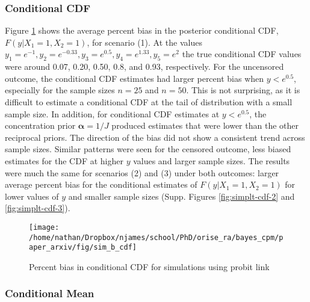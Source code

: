 \documentclass[
]{article}
\begin{document}
\hypertarget{conditional-cdf}{%
\subsubsection{Conditional CDF}\label{conditional-cdf}}

Figure \ref{fig:simplt-cdf-1} shows the average percent bias in the posterior conditional CDF, \(F(y|X_1=1,X_2=1)\), for scenario (1). At the values \(y_1=e^{-1},y_2=e^{-0.33},y_3=e^{0.5},y_4=e^{1.33},y_5=e^2\) the true conditional CDF values were around 0.07, 0.20, 0.50, 0.8, and 0.93, respectively. For the uncensored outcome, the conditional CDF estimates had larger percent bias when \(y<e^{0.5}\), especially for the sample sizes \(n=25\) and \(n=50\). This is not surprising, as it is difficult to estimate a conditional CDF at the tail of distribution with a small sample size. In addition, for conditional CDF estimates at \(y<e^{0.5}\), the concentration prior \(\boldsymbol{\alpha}=1/J\) produced estimates that were lower than the other reciprocal priors. The direction of the bias did not show a consistent trend across sample sizes. Similar patterns were seen for the censored outcome, less biased estimates for the CDF at higher \(y\) values and larger sample sizes. The results were much the same for scenarios (2) and (3) under both outcomes: larger average percent bias for the conditional estimates of \(F(y|X_1=1,X_2=1)\) for lower values of \(y\) and smaller sample sizes (Supp. Figures \ref{fig:simplt-cdf-2} and \ref{fig:simplt-cdf-3}).

\begin{figure}

{\centering \texttt{[image: /home/nathan/Dropbox/njames/school/PhD/orise\_ra/bayes\_cpm/paper\_arxiv/fig/sim\_b\_cdf]} 

}

\caption{Percent bias in conditional CDF for simulations using probit link}\label{fig:simplt-cdf-1}
\end{figure}

\hypertarget{conditional-mean}{%
\subsubsection{Conditional Mean}\label{conditional-mean}}
\end{document}
